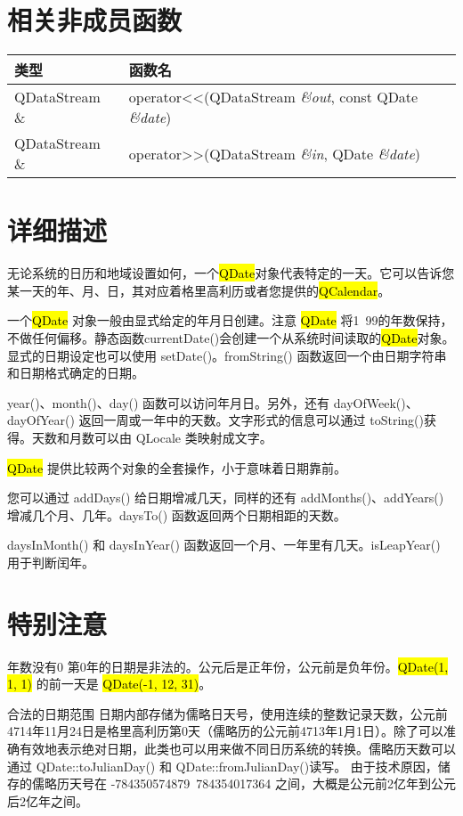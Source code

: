 \splitLine

\section{相关非成员函数}

\begin{tabular}{|l|l|}
\hline
类型&	函数名\\
\hline
QDataStream \& &	operator<<(QDataStream \emph{\&out}, const QDate \emph{\&date}) \\
\hline
QDataStream \&	& operator>>(QDataStream \emph{\&in}, QDate \emph{\&date})\\
\hline
\end{tabular}

\section{详细描述}

无论系统的日历和地域设置如何，一个\hl{QDate}对象代表特定的一天。它可以告诉您某一天的年、月、日，其对应着格里高利历或者您提供的\hl{QCalendar}。

一个\hl{QDate} 对象一般由显式给定的年月日创建。注意 \hl{QDate} 将1~99的年数保持，不做任何偏移。静态函数currentDate()会创建一个从系统时间读取的\hl{QDate}对象。显式的日期设定也可以使用 setDate()。fromString() 函数返回一个由日期字符串和日期格式确定的日期。

year()、month()、day() 函数可以访问年月日。另外，还有 dayOfWeek()、dayOfYear() 返回一周或一年中的天数。文字形式的信息可以通过 toString()获得。天数和月数可以由 QLocale 类映射成文字。

\hl{QDate} 提供比较两个对象的全套操作，小于意味着日期靠前。

您可以通过 addDays() 给日期增减几天，同样的还有 addMonths()、addYears() 增减几个月、几年。daysTo() 函数返回两个日期相距的天数。

daysInMonth() 和 daysInYear() 函数返回一个月、一年里有几天。isLeapYear() 用于判断闰年。

\section{特别注意}

\begin{compactitem}
\item 年数没有0 第0年的日期是非法的。公元后是正年份，公元前是负年份。\hl{QDate(1, 1, 1)} 的前一天是 \hl{QDate(-1, 12, 31)}。
\item 合法的日期范围 日期内部存储为儒略日天号，使用连续的整数记录天数，公元前4714年11月24日是格里高利历第0天（儒略历的公元前4713年1月1日）。除了可以准确有效地表示绝对日期，此类也可以用来做不同日历系统的转换。儒略历天数可以通过 QDate::toJulianDay() 和 QDate::fromJulianDay()读写。 由于技术原因，储存的儒略历天号在 -784350574879~784354017364 之间，大概是公元前2亿年到公元后2亿年之间。
\end{compactitem}


